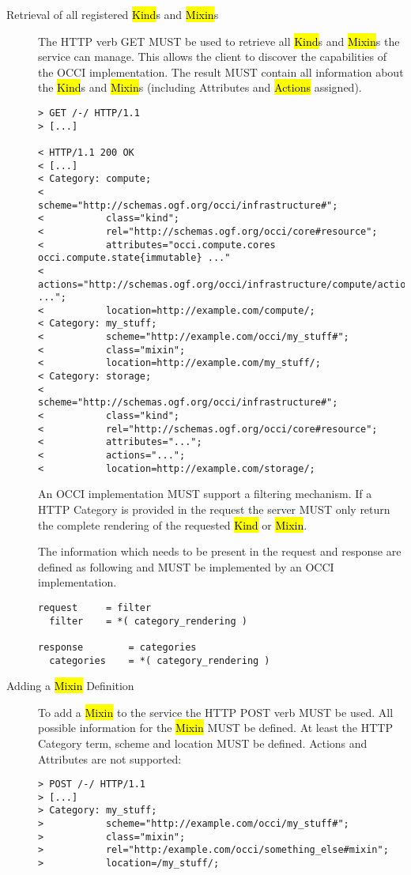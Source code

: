 \documentclass[10pt,a4paper]{article}
\begin{document}
\begin{description}
  \item[Retrieval of all registered \hl{Kind}s and \hl{Mixin}s] The
    HTTP verb GET MUST be used to retrieve all \hl{Kind}s and
    \hl{Mixin}s the service can manage. This allows the client to
    discover the capabilities of the OCCI implementation. The result
    MUST contain all information about the \hl{Kind}s and \hl{Mixin}s
    (including Attributes and \hl{Actions} assigned).

\begin{verbatim}
> GET /-/ HTTP/1.1
> [...]
 
< HTTP/1.1 200 OK
< [...]
< Category: compute;
<           scheme="http://schemas.ogf.org/occi/infrastructure#";
<           class="kind";
<           rel="http://schemas.ogf.org/occi/core#resource";
<           attributes="occi.compute.cores occi.compute.state{immutable} ..."
<           actions="http://schemas.ogf.org/occi/infrastructure/compute/action#stop ...";
<           location=http://example.com/compute/;
< Category: my_stuff;
<           scheme="http://example.com/occi/my_stuff#";
<           class="mixin";
<           location=http://example.com/my_stuff/;
< Category: storage;
<           scheme="http://schemas.ogf.org/occi/infrastructure#";
<           class="kind";
<           rel="http://schemas.ogf.org/occi/core#resource";
<           attributes="...";
<           actions="...";
<           location=http://example.com/storage/;
\end{verbatim}

    An OCCI implementation MUST support a filtering mechanism. If a
    HTTP Category is provided in the request the server MUST only
    return the complete rendering of the requested \hl{Kind} or
    \hl{Mixin}.

    The information which needs to be present in the request and
    response are defined as following and MUST be implemented by an
    OCCI implementation.

\begin{verbatim}
request     = filter
  filter    = *( category_rendering )

response        = categories
  categories    = *( category_rendering )
\end{verbatim}

  \item[Adding a \hl{Mixin} Definition] To add a \hl{Mixin} to the
    service the HTTP POST verb MUST be used. All possible information
    for the \hl{Mixin} MUST be defined. At least the HTTP Category
    term, scheme and location MUST be defined. Actions and Attributes
    are not supported:
\begin{verbatim}
> POST /-/ HTTP/1.1
> [...]
> Category: my_stuff;
>           scheme="http://example.com/occi/my_stuff#";
>           class="mixin";
>           rel="http:/example.com/occi/something_else#mixin";
>           location=/my_stuff/;


\end{verbatim}
\end{description}
\end{document}
